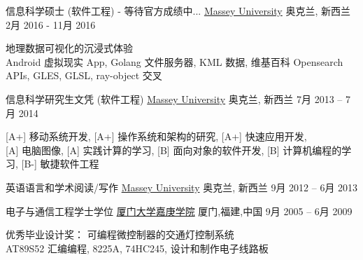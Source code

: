 
\begin{cventries}
\cventry
{信息科学硕士 (软件工程) - 等待官方成绩中...}
{\href{http://www.massey.ac.nz/}{Massey University}}
{奥克兰, \enskip 新西兰}
{2月 2016 - 11月 2016}
{
	\begin{cvitems}
		\item {地理数据可视化的沉浸式体验\\
			Android 虚拟现实 App, Golang 文件服务器, KML 数据, 维基百科 Opensearch APIs, GLES, GLSL, ray-object 交叉}
	\end{cvitems}
}
\end{cventries}

\begin{cventries}
	\cventry
	{信息科学研究生文凭 (软件工程)}
	{\href{http://www.massey.ac.nz/}{Massey University}}
	{奥克兰, \enskip 新西兰}
	{7月 2013 – 7月 2014}
	{
		\begin{cvitems}
			\item{[A+] 移动系统开发},\enskip
			{[A+] 操作系统和架构的研究},\enskip
			{[A+] 快速应用开发},\enskip\\
			{[A] 电脑图像},\enskip
			{[A] 实践计算的学习},\enskip
			{[B] 面向对象的软件开发},\enskip
			{[B] 计算机编程的学习},\enskip
			{[B-] 敏捷软件工程}\enskip
		\end{cvitems}
	}
\end{cventries}

\begin{cventries}
	\cventry
	{英语语言和学术阅读/写作}
	{\href{http://www.massey.ac.nz/}{Massey University}}
	{奥克兰, \enskip 新西兰}
	{9月 2012 – 6月 2013}
	{
		\begin{cvitems}
		\end{cvitems}
	}
\end{cventries}

\begin{cventries}
	\cventry
	{电子与通信工程学士学位}
	{\href{http://www.xmu.edu.cn/en/}{厦门大学嘉庚学院}}
	{厦门,\enskip 福建,\enskip 中国}
	{9月 2005 – 6月 2009}
	{
		\begin{cvitems}
			\item {优秀毕业设计奖： 可编程微控制器的交通灯控制系统\\
			AT89S52 汇编编程, 8225A, 74HC245, 设计和制作电子线路板}
		\end{cvitems}
	}
\end{cventries}


